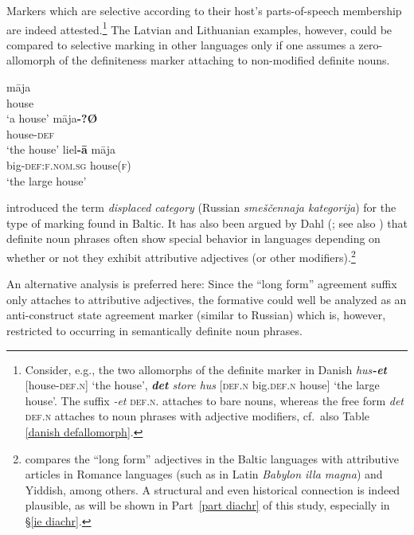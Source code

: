 Markers which are selective according to their host's parts-of-speech membership are indeed attested.\footnote{Consider, e.g., the two allomorphs of the definite marker in Danish \textit{hus\textbf{-et}} [house-\textsc{def.n}] ‘the house’, \textit{\textbf{det} store hus} [\textsc{def.n} big\textsc{.def.n} house] ‘the large house’. The suffix \textit{-et} \textsc{def.n.} attaches to bare nouns, whereas the free form \textit{det} \textsc{def.n} attaches to noun phrases with adjective modifiers, cf.~also Table \ref{danish defallomorph}.} The Latvian and Lithuanian examples, however, could be compared to selective marking in other languages only if one assumes a zero-allomorph of the definiteness marker attaching to non-modified definite nouns.
\begin{exe}
\ex
{}
\begin{xlist}
\ex
\gll 	māja\\
	house\\
\glt	‘a house’
\ex	
\gll 	māja\textbf{-?Ø}\\
	house-\textsc{def}\\
\glt	‘the house’
\ex		
\gll 	liel\textbf{-ā} māja\\
	big-\textsc{def:f.nom.sg} house(\textsc{f})\\
\glt	‘the large house’
\end{xlist}
\end{exe}
\citet[31]{melcuk1998} introduced the term \emph{displaced category} (Russian \emph{smeščennaja kategorija}) for the type of marking found in Baltic. It has also been argued by Dahl (\citeyear[149–152]{dahl2003}; see also \citealt[115]{dahl2007}) that definite noun phrases often show special behavior in languages depending on whether or not they exhibit attributive adjectives (or other modifiers).\footnote{\citet[150]{dahl2003} compares the “long form” adjectives in the Baltic languages with attributive articles in Romance languages (such as in Latin \textit{Babylon illa magna}) and Yiddish, among others. A structural and even historical connection is indeed plausible, as will be shown in Part~\ref{part diachr} of this study, especially in \S\ref{ie diachr}.}

An alternative analysis is preferred here: Since the “long form” agreement suffix only attaches to attributive adjectives, the formative could well be analyzed as an anti-construct state agreement marker (similar to Russian) which is, however, restricted to occurring in semantically definite noun phrases. 


